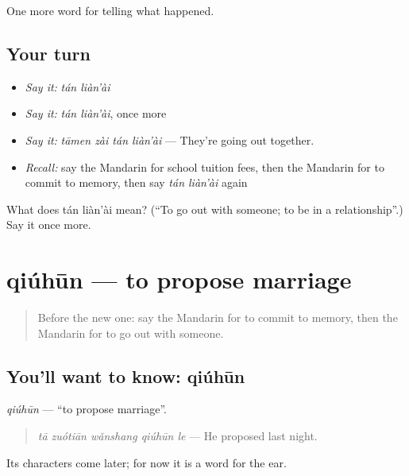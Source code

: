 \begin{grammarlens}[title={What you've built}]
One more word for telling what happened.
\end{grammarlens}

\subsection*{Your turn}
\begin{itemize}
\raggedright
  \item \emph{Say it:} \emph{tán liàn'ài}
  \item \emph{Say it:} \emph{tán liàn'ài}, once more
  \item \emph{Say it:} \emph{tāmen zài tán liàn'ài} — They're going out together.
  \item \emph{Recall:} say the Mandarin for school tuition fees, then the Mandarin for to commit to memory, then say \emph{tán liàn'ài} again
\end{itemize}

\begin{tcolorbox}[breakable,colback=teal!4,colframe=teal!35!black,title={Before you move on}]
What does tán liàn'ài mean? (\textquotedblleft{}To go out with someone; to be in a relationship\textquotedblright{}.) Say it once more.
\end{tcolorbox}
\section[qiúhūn]{qiúhūn — to propose marriage}

\label{lesson:ZH-C305-qiuhun}



\begin{quote}
Before the new one: say the Mandarin for to commit to memory, then the Mandarin for to go out with someone.
\end{quote}

\subsection*{You'll want to know: qiúhūn}
\emph{qiúhūn} — \textquotedblleft{}to propose marriage\textquotedblright{}.

\begin{quote}
\emph{tā zuótiān wǎnshang qiúhūn le} — He proposed last night.
\end{quote}

Its characters come later; for now it is a word for the ear.

